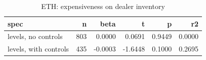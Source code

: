 \begin{table}
\caption{ETH: expensiveness on dealer inventory}
\label{tab:t5_timeseries_ETH}
\begin{tabular}{lrrrrr}
\toprule
spec & n & beta & t & p & r2 \\
\midrule
levels, no controls & 803 & 0.0000 & 0.0691 & 0.9449 & 0.0000 \\
levels, with controls & 435 & -0.0003 & -1.6448 & 0.1000 & 0.2695 \\
\bottomrule
\end{tabular}
\end{table}
